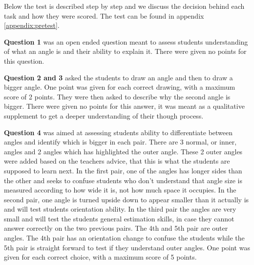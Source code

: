 
\bigskip\noindent
Below the test is described step by step and we discuss the decision behind each task and how they were scored. The test can be found in appendix \ref{appendix:pretest}.

\bigskip\noindent
\textbf{Question 1} was an open ended question meant to assess students understanding of what an angle is and their ability to explain it. There were given no points for this question.

\bigskip\noindent
\textbf{Question 2 and 3} asked the students to draw an angle and then to draw a bigger angle. 
One point was given for each correct drawing, with a maximum score of 2 points.
They were then asked to describe why the second angle is bigger. 
There were given no points for this answer, it was meant as a qualitative supplement to get a deeper understanding of their though process.

\bigskip\noindent
\textbf{Question 4} was aimed at assessing students ability to differentiate between angles and identify which is bigger in each pair. There are 3 normal, or inner, angles and 2 angles which has highlighted the outer angle. These 2 outer angles were added based on the teachers advice, that this is what the students are supposed to learn next. In the first pair, one of the angles has longer sides than the other and seeks to confuse students who don't understand that angle size is measured according to how wide it is, not how much space it occupies. In the second pair, one angle is turned upside down to appear smaller than it actually is and will test students orientation ability. In the third pair the angles are very small and will test the students general estimation skills, in case they cannot answer correctly on the two previous pairs. The 4th and 5th pair are outer angles. The 4th pair has an orientation change to confuse the students while the 5th pair is straight forward to test if they understand outer angles. One point was given for each correct choice, with a maximum score of 5 points.

